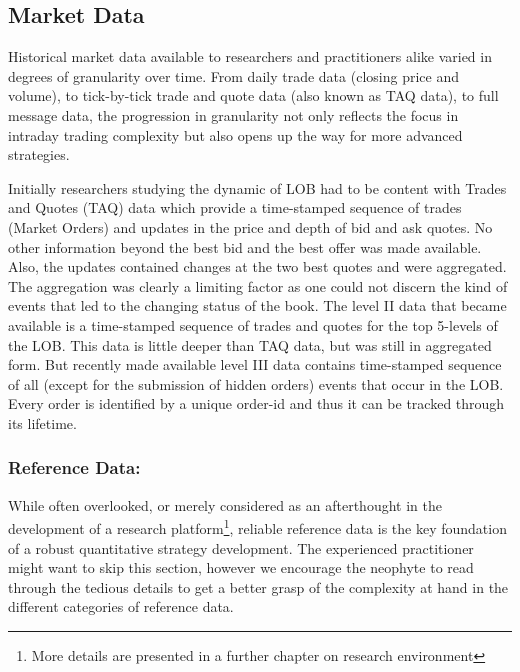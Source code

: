 \subsection{Market Data}



Historical market data available to researchers and practitioners alike varied in degrees of granularity over time. From daily trade data (closing price and volume), to tick-by-tick trade and quote data (also known as TAQ data), to full message data, the progression in granularity not only reflects the focus in intraday trading complexity but also opens up the way for more advanced strategies. 


Initially researchers studying the dynamic of LOB had to be content with Trades and Quotes (TAQ) data which provide a time-stamped sequence of trades (Market Orders) and updates in the price and depth of bid and ask quotes. No other information beyond the best bid and the best offer was made available. Also, the updates contained changes at the two best quotes and were aggregated. The aggregation was clearly a limiting factor as one could not discern the kind of events that led to the changing status of the book. The level II data that became available is a time-stamped sequence of trades and quotes for the top 5-levels of the LOB. This data is little deeper than TAQ data, but was still in aggregated form. But recently made available level III data contains time-stamped sequence of all (except for the submission of hidden orders) events that occur in the LOB. Every order is identified by a unique order-id and thus it can be tracked through its lifetime. \\


\subsubsection{Reference Data:} 
While often overlooked, or merely considered as an afterthought in the development of a research platform\footnote{More details are presented in a further chapter on research environment}, reliable reference data is the key foundation of a robust quantitative strategy development. The experienced practitioner might want to skip this section, however we encourage the neophyte to read through the tedious details to get a better grasp of the complexity at hand in the
different categories of reference data.

